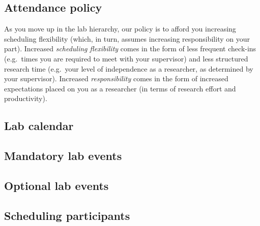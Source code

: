 \documentclass{tufte-book} %
\begin{document}
 \subsection{Attendance policy}
 As you move up in the lab hierarchy, our policy is to afford
 you increasing scheduling flexibility (which, in turn, assumes
 increasing responsibility on your part).  Increased
 \textit{scheduling flexibility} comes in the form of less frequent
 check-ins (e.g.\ times you are required to meet with your supervisor)
 and less structured research time (e.g.\ your level of independence
 as a researcher, as determined by your supervisor).  Increased
 \textit{responsibility} comes in the form of increased expectations
 placed on you as a researcher (in terms of research effort and
 productivity).





 \subsection{Lab calendar}
 \subsection{Mandatory lab events}
 \subsection{Optional lab events}
 \subsection{Scheduling participants}


\end{document}

